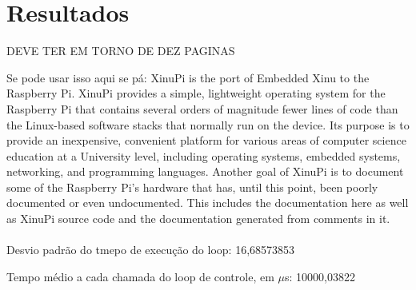 \section{Resultados}
\label{sec:resultados}

DEVE TER EM TORNO DE DEZ PAGINAS


Se pode usar isso aqui se pá: XinuPi is the port of Embedded Xinu to the Raspberry Pi. XinuPi provides a simple, lightweight operating system for the Raspberry Pi that contains several orders of magnitude fewer lines of code than the Linux-based software stacks that normally run on the device. Its purpose is to provide an inexpensive, convenient platform for various areas of computer science education at a University level, including operating systems, embedded systems, networking, and programming languages. Another goal of XinuPi is to document some of the Raspberry Pi’s hardware that has, until this point, been poorly documented or even undocumented. This includes the documentation here as well as XinuPi source code and the documentation generated from comments in it.
\\\\
Desvio padrão do tmepo de execução do loop: 16,68573853

Tempo médio a cada chamada do loop de controle, em $\mu$s: 10000,03822
